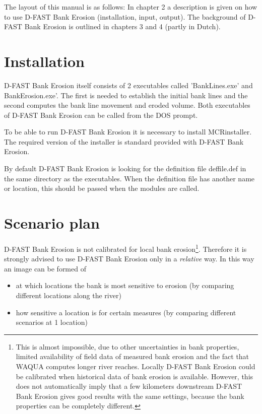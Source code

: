 The layout of this manual is as follows: In chapter 2 a description is given on how to use D-FAST Bank Erosion (installation, input, output).
The background of D-FAST Bank Erosion is outlined in chapters 3 and 4 (partly in Dutch).

\section{Installation}

D-FAST Bank Erosion itself consists of 2 executables called 'BankLines.exe' and BankErosion.exe'.
The first is needed to establish the initial bank lines and the second computes the bank line movement and eroded volume.
Both executables of D-FAST Bank Erosion can be called from the DOS prompt.

To be able to run D-FAST Bank Erosion it is necessary to install MCRinstaller.
The required version of the installer is standard provided with D-FAST Bank Erosion.

By default D-FAST Bank Erosion is looking for the definition file deffile.def in the same directory as the executables.
When the definition file has another name or location, this should be passed when the modules are called.

\section{Scenario plan}

D-FAST Bank Erosion is not calibrated for local bank erosion\footnote{This is almost impossible, due to other uncertainties in bank properties, limited availability of field data of measured bank erosion and the fact that WAQUA computes longer river reaches.
Locally D-FAST Bank Erosion could be calibrated when historical data of bank erosion is available.
However, this does not automatically imply that a few kilometers downstream D-FAST Bank Erosion gives good results with the same settings, because the bank properties can be completely different.}.
Therefore it is strongly advised to use D-FAST Bank Erosion only in a \emph{relative} way.
In this way an image can be formed of

\begin{itemize}
\item at which locations the bank is most sensitive to erosion (by comparing different locations along the river)
\item how sensitive a location is for certain measures (by comparing different scenarios at 1 location)
\end{itemize}

